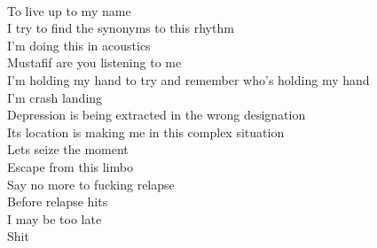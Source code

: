 \documentclass[12pt, b5paper]{article}
\begin{document}
\\To live up to my name
\\I try to find the synonyms to this rhythm
\\I'm doing this in acoustics
\\Mustafif are you listening to me
\\I'm holding my hand to try and remember who's holding my hand
\\I'm crash landing
\\Depression is being extracted in the wrong designation
\\Its location is making me in this complex situation
\\Lets seize the moment
\\Escape from this limbo
\\Say no more to fucking relapse
\\Before relapse hits
\\I may be too late
\\Shit

\newpage 
\end{document}

